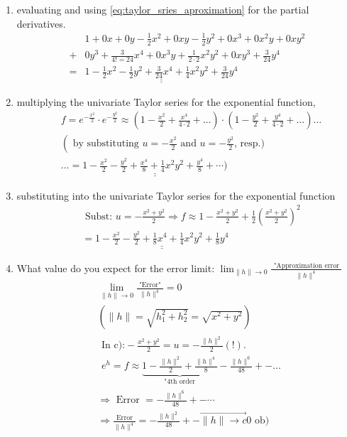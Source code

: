 \begin{enumerate}
    \item evaluating and using \autoref{eq:taylor_sries_aproximation} for the partial derivatives.
    $$
    \begin{aligned}
    & 1+0 x+0 y-\frac{1}{2} x^2+0 x y-\frac{1}{2} y^2+0 x^3+0 x^2 y+0 x y^2 \\
    + & 0 y^3+\frac{3}{4 !=24} x^4+0 x^3 y+\frac{1}{2 \cdot 2} x^2 y^2+0 x y^3+\frac{3}{24} y^4 \\
    = & \underline{\underline{1-\frac{1}{2} x^2-\frac{1}{2} y^2+\frac{3}{24} x^4+\frac{1}{4} x^2 y^2+\frac{3}{24} y^4}}
    \end{aligned}
    $$
    \item multiplying the univariate Taylor series for the exponential function,
    $$
    \begin{aligned}
    & f=e^{-\frac{x^2}{2}} \cdot e^{-\frac{y^2}{2}} \approx\left(1-\frac{x^2}{2}+\frac{x^4}{4 \cdot 2}+\ldots\right) \cdot\left(1-\frac{y^2}{2}+\frac{y^4}{4 \cdot 2}+\ldots\right) \ldots \\
    & \left(\text { by substituting } u=-\frac{x^2}{2} \text { and } u=-\frac{y^2}{2}\right. \text {, resp.) } \\
    & \ldots=\underline{\underline{1-\frac{x^2}{2}-\frac{y^2}{2}+\frac{x^4}{8}+\frac{1}{4} x^2 y^2+\frac{y^4}{8}+\cdots)}}
    \end{aligned}
    $$
    \item substituting into the univariate Taylor series for the exponential function
    $$
    \begin{aligned}
    & \text { Subst: } u=-\frac{x^2+y^2}{2} \Rightarrow f \approx 1-\frac{x^2+y^2}{2}+\frac{1}{2}\left(\frac{x^2+y^2}{2}\right)^2 \\
    & =\underline{\underline{1-\frac{x^2}{2}-\frac{y^2}{2}+\frac{1}{8} x^4+\frac{1}{4} x^2 y^2+\frac{1}{8} y^4}}
    \end{aligned}
    $$
    \item What value do you expect for the error limit: $\lim _{\|h\| \rightarrow 0} \frac{\text { "Approximation error }}{\|h\|^4}$
    $$
    \begin{aligned}
    & \lim _{\|h\| \rightarrow 0} \frac{\text { "Error" }}{\|h\|^4}=0 \\
    & \left(\|h\|=\sqrt{h_1^2+h_2^2}=\sqrt{x^2+y^2}\right) \\
    & \begin{array}{l}
    \text{In c):}-\frac{x^2+y^2}{2}=u=-\frac{\|h\|^2}{2}(!). \\
    e^h=f\approx \underbrace{1-\frac{\|h\|^2}{2}+\frac{\|h\|^4}{8}}_{\text {"4th order}}-\frac{\|h\|^6}{48}+-\ldots
    \end{array} \\
    & \Rightarrow \text { Error }=-\frac{\|h\|^6}{48}+-\cdots \\
    & \Longrightarrow \frac{\text{Error}}{\|h\|^4}=-\frac{\|h\|^2}{48}+-\overrightarrow{\|h\| \rightarrow c} 0 \text { ob) } \\
    &
    \end{aligned}
    $$
\end{enumerate}
